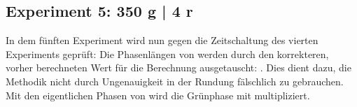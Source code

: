 %

\subsection{Experiment 5: 350 g | 4 r}\label{subsec:experiment-5}

In dem fünften Experiment wird nun gegen die Zeitschaltung des vierten Experiments geprüft:
Die Phasenlängen von  werden durch den korrekteren, vorher berechneten Wert für die Berechnung ausgetauscht:  .
Dies dient dazu, die Methodik nicht durch Ungenauigkeit in der Rundung fälschlich zu gebrauchen.
Mit den eigentlichen Phasen von  wird die Grünphase mit  multipliziert.

